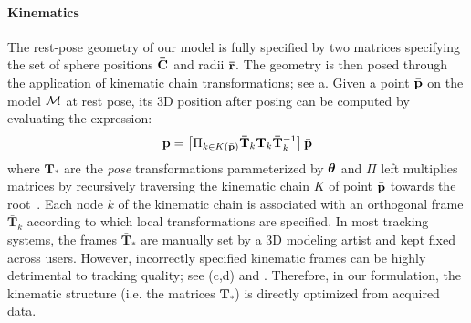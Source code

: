 \paragraph{Kinematics}
The rest-pose geometry of our model is fully specified by two matrices specifying the set of sphere positions ${\mathbf{\bar{C}}}$ and  radii ${\mathbf{\bar{r}}}$. The geometry is then posed through the application of  kinematic chain transformations; see a. Given a point $\bar{\mathbf{p}}$ on the model $\mathcal{M}$ at rest pose, its 3D position after posing can be computed by evaluating the expression:
% 
\begin{equation}
\mathbf{p} = \left[ \Pi_{k \in K(\bar{\mathbf{p}})} \mathbf{\bar{T}}_k \mathbf{T}_k \mathbf{\bar{T}}_k^{-1} \right] \bar{\mathbf{p}}
\label{eq:kinematic}
\end{equation}
%
where $\mathbf{T}_*$ are the \emph{pose} transformations parameterized by $\boldsymbol{\theta}$ and $\Pi$ left multiplies matrices by recursively traversing the kinematic chain $K$ of point $\bar{\mathbf{p}}$ towards the root~\cite{buss_04}. 
Each node $k$ of the kinematic chain is associated with an orthogonal frame $\mathbf{\bar{T}}_k$ according to which local transformations are specified. In most tracking systems, the frames $\mathbf{\bar{T}}_*$ are manually set by a 3D modeling artist and kept fixed across users. However, incorrectly specified kinematic frames can be highly detrimental to tracking quality; see (c,d) and \VideoKinematic{}. Therefore, in our formulation, the kinematic structure (i.e. the matrices $\mathbf{\bar{T}}_*$) is directly optimized from acquired data.




\newpage
